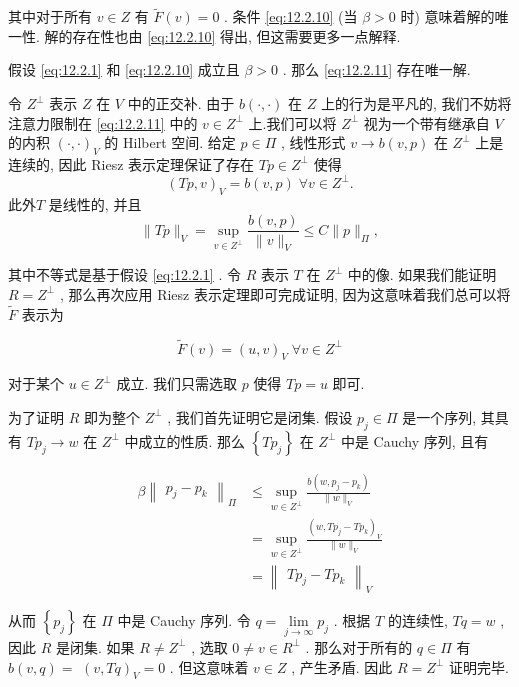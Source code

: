其中对于所有 $v \in  Z$ 有 $\widetilde{F}\left( v\right)  = 0$ . 条件 \eqref{eq:12.2.10} (当 $\beta  > 0$ 时) 意味着解的唯一性. 解的存在性也由 \eqref{eq:12.2.10} 得出, 但这需要更多一点解释.
\begin{Lemma}
假设 \eqref{eq:12.2.1} 和 \eqref{eq:12.2.10} 成立且 $\beta  > 0$ . 那么 \eqref{eq:12.2.11} 存在唯一解.
\end{Lemma}
\begin{Proof}令 ${Z}^{ \bot  }$ 表示 $Z$ 在 $V$ 中的正交补. 由于 $b\left( {\cdot , \cdot  }\right)$ 在 $Z$ 上的行为是平凡的, 我们不妨将注意力限制在 \eqref{eq:12.2.11} 中的 $v \in  {Z}^{ \bot  }$ 上.我们可以将 ${Z}^{ \bot  }$ 视为一个带有继承自 $V$ 的内积 ${\left( \cdot , \cdot  \right) }_{V}$ 的 Hilbert 空间. 给定 $p \in  \varPi$ , 线性形式 $v \rightarrow  b\left( {v,p}\right)$ 在 ${Z}^{ \bot  }$ 上是连续的, 因此 Riesz 表示定理保证了存在 ${Tp} \in  {Z}^{ \bot  }$ 使得
\begin{equation}\label{eq:12.2.13}
{\left( Tp,v\right) }_{V} = b\left( {v,p}\right) \;\forall v \in  {Z}^{ \bot  }.
\end{equation}
此外$T$ 是线性的, 并且
$$
\| {Tp}\|_{V} = \mathop{\sup }\limits_{{v \in  {Z}^{ \bot  }}}\frac{b\left( {v,p}\right) }{\| v\|_{V}} \leq  C\| p\|_{\varPi },
$$

其中不等式是基于假设 \eqref{eq:12.2.1} . 令 $R$ 表示 $T$ 在 ${Z}^{ \bot  }$ 中的像. 如果我们能证明 $R = {Z}^{ \bot  }$ , 那么再次应用 Riesz 表示定理即可完成证明, 因为这意味着我们总可以将 $\widetilde{F}$ 表示为

$$
\widetilde{F}\left( v\right)  = {\left( u,v\right) }_{V}\;\forall v \in  {Z}^{ \bot  }
$$

对于某个 $u \in  {Z}^{ \bot  }$ 成立. 我们只需选取 $p$ 使得 ${Tp} = u$ 即可.

为了证明 $R$ 即为整个 ${Z}^{ \bot  }$ , 我们首先证明它是闭集. 假设 ${p}_{j} \in  \varPi$ 是一个序列, 其具有 $T{p}_{j} \rightarrow  w$ 在 ${Z}^{ \bot  }$ 中成立的性质. 那么 $\left\{  {T{p}_{j}}\right\}$ 在 ${Z}^{ \bot  }$ 中是 Cauchy 序列, 且有

$$
\begin{aligned}
\beta {\begin{Vmatrix}{p}_{j} - {p}_{k}\end{Vmatrix}}_{\varPi } &\leq  \mathop{\sup }\limits_{{w \in  {Z}^{ \bot  }}}\frac{b\left( {w,{p}_{j} - {p}_{k}}\right) }{\| w\|_{V}}\\
&= \mathop{\sup }\limits_{{w \in  {Z}^{ \bot  }}}\frac{{\left( w,T{p}_{j} - T{p}_{k}\right) }_{V}}{\| w\|_{V}}\\
&= {\begin{Vmatrix}T{p}_{j} - T{p}_{k}\end{Vmatrix}}_{V}
\end{aligned}
$$

从而 $\left\{  {p}_{j}\right\}$ 在 $\varPi$ 中是 Cauchy 序列. 令 $q = \mathop{\lim }\limits_{{j \rightarrow  \infty }}{p}_{j}$ . 根据 $T$ 的连续性, ${Tq} = w$ , 因此 $R$ 是闭集. 如果 $R \neq  {Z}^{ \bot  }$ , 选取 $0 \neq  v \in  {R}^{ \bot  }$ . 那么对于所有的 $q \in  \varPi$ 有 $b\left( {v,q}\right)  =$  ${\left( v,Tq\right) }_{V} = 0$ . 但这意味着 $v \in  Z$ , 产生矛盾. 因此 $R = {Z}^{ \bot  }$ 证明完毕.
\end{Proof}

